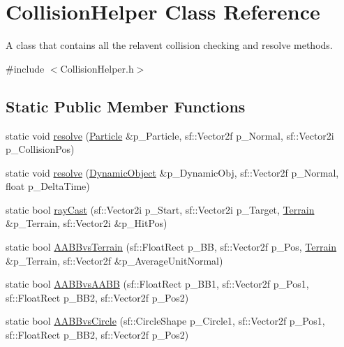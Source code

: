 \hypertarget{class_collision_helper}{}\section{Collision\+Helper Class Reference}
\label{class_collision_helper}


A class that contains all the relavent collision checking and resolve methods.  




{\ttfamily \#include $<$Collision\+Helper.\+h$>$}

\subsection*{Static Public Member Functions}
\begin{DoxyCompactItemize}
\item 
static void \hyperlink{class_collision_helper_a57aca4d1a02c1309ca7f80eaecbb4edf}{resolve} (\hyperlink{class_particle}{Particle} \&p\+\_\+\+Particle, sf\+::\+Vector2f p\+\_\+\+Normal, sf\+::\+Vector2i p\+\_\+\+Collision\+Pos)
\item 
static void \hyperlink{class_collision_helper_aec0ce6765c1be0da596147c9df11e69d}{resolve} (\hyperlink{class_dynamic_object}{Dynamic\+Object} \&p\+\_\+\+Dynamic\+Obj, sf\+::\+Vector2f p\+\_\+\+Normal, float p\+\_\+\+Delta\+Time)
\item 
static bool \hyperlink{class_collision_helper_a29f24f7dfa3f65415d415dd23e31bed1}{ray\+Cast} (sf\+::\+Vector2i p\+\_\+\+Start, sf\+::\+Vector2i p\+\_\+\+Target, \hyperlink{class_terrain}{Terrain} \&p\+\_\+\+Terrain, sf\+::\+Vector2i \&p\+\_\+\+Hit\+Pos)
\item 
static bool \hyperlink{class_collision_helper_a98d43fd6735513956419fceb047ac4bd}{A\+A\+B\+Bvs\+Terrain} (sf\+::\+Float\+Rect p\+\_\+\+BB, sf\+::\+Vector2f p\+\_\+\+Pos, \hyperlink{class_terrain}{Terrain} \&p\+\_\+\+Terrain, sf\+::\+Vector2f \&p\+\_\+\+Average\+Unit\+Normal)
\item 
static bool \hyperlink{class_collision_helper_a11469523b5a2b22f10d7d827af1f7e18}{A\+A\+B\+Bvs\+A\+A\+BB} (sf\+::\+Float\+Rect p\+\_\+\+B\+B1, sf\+::\+Vector2f p\+\_\+\+Pos1, sf\+::\+Float\+Rect p\+\_\+\+B\+B2, sf\+::\+Vector2f p\+\_\+\+Pos2)
\item 
static bool \hyperlink{class_collision_helper_a3f3e49b546e37ce2e457dc6582c97adf}{A\+A\+B\+Bvs\+Circle} (sf\+::\+Circle\+Shape p\+\_\+\+Circle1, sf\+::\+Vector2f p\+\_\+\+Pos1, sf\+::\+Float\+Rect p\+\_\+\+B\+B2, sf\+::\+Vector2f p\+\_\+\+Pos2)
\end{DoxyCompactItemize}



